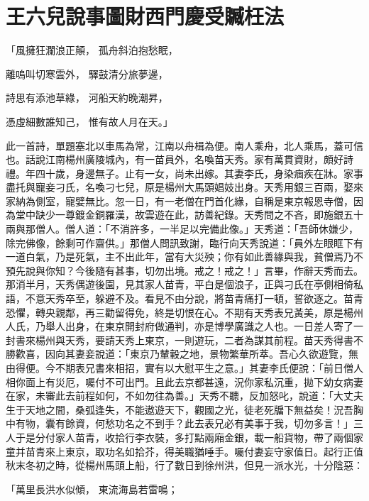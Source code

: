 %

\chapter{王六兒說事圖財\KG 西門慶受贓枉法}

「風擁狂瀾浪正顛，  孤舟斜泊抱愁眠，

離嗚叫切寒雲外，  驛鼓清分旅夢邊，

詩思有添池草綠，  河船天約晚潮昇，

憑虛細數誰知己，  惟有故人月在天。」

此一首詩，單題塞北以車馬為常，江南以舟楫為便。南人乘舟，北人乘馬，蓋可信也。話說江南楊州廣陵城內，有一苗員外，名喚苗天秀。家有萬貫資財，頗好詩禮。年四十歲，身邊無子。止有一女，尚未出嫁。其妻李氏，身染痼疾在牀。家事盡托與寵妾刁氏，名喚刁七兒，原是楊州大馬頭娼妓出身。天秀用銀三百兩，娶來家納為側室，寵嬖無比。忽一日，有一老僧在門首化緣，自稱是東京報恩寺僧，因為堂中缺少一尊鍍金銅羅漢，故雲遊在此，訪善紀錄。天秀問之不吝，即施銀五十兩與那僧人。僧人道：「不消許多，一半足以完備此像。」天秀道：「吾師休嫌少，除完佛像，餘剩可作齋供。」那僧人問訊致謝，臨行向天秀說道：「員外左眼眶下有一道白氣，乃是死氣，主不出此年，當有大災殃；你有如此善緣與我，貧僧焉乃不預先說與你知？今後隨有甚事，切勿出境。戒之！戒之！」言畢，作辭天秀而去。那消半月，天秀偶遊後園，見其家人苗青，平白是個浪子，正與刁氏在亭側相倚私語，不意天秀卒至，躲避不及。看見不由分說，將苗青痛打一頓，誓欲逐之。苗青恐懼，轉央親鄰，再三勸留得免，終是切恨在心。不期有天秀表兄黃美，原是楊州人氏，乃舉人出身，在東京開封府做通判，亦是博學廣識之人也。一日差人寄了一封書來楊州與天秀，要請天秀上東京，一則遊玩，二者為謀其前程。苗天秀得書不勝歡喜，因向其妻妾說道：「東京乃輦轂之地，景物繁華所萃。吾心久欲遊覽，無由得便。今不期表兄書來相招，實有以大慰平生之意。」其妻李氏便說：「前日僧人相你面上有災厄，囑付不可出門。且此去京都甚遠，況你家私沉重，拋下幼女病妻在家，未審此去前程如何，不如勿往為善。」天秀不聽，反加怒叱，說道：「大丈夫生于天地之間，桑弧逢失，不能遨遊天下，觀國之光，徒老死牖下無益矣！況吾胸中有物，囊有餘資，何愁功名之不到手？此去表兄必有美事于我，切勿多言！」三人于是分付家人苗青，收拾行李衣裝，多打點兩廂金銀，載一船貨物，帶了兩個家童并苗青來上東京，取功名如拾芥，得美職猶唾手。囑付妻妄守家值日。起行正值秋末冬初之時，從楊州馬頭上船，行了數日到徐州洪，但見一派水光，十分陰惡：

「萬里長洪水似傾，  東流海島若雷鳴；

